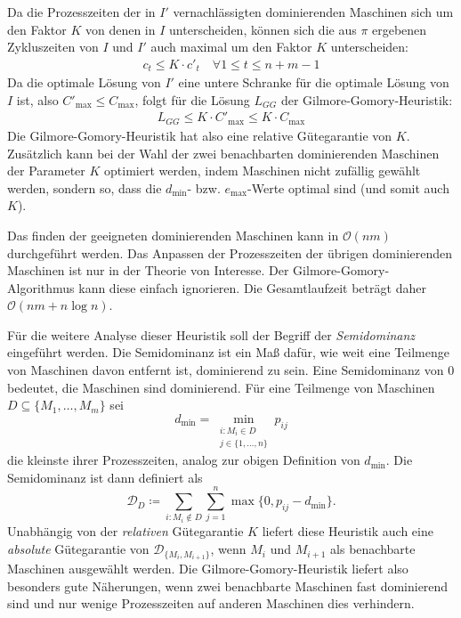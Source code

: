 \documentclass{scrreprt}
\begin{document}
Da die Prozesszeiten der in $I'$ vernachlässigten dominierenden Maschinen sich um den Faktor $K$ von denen in $I$ unterscheiden, 
können sich die aus $\pi$ ergebenen Zykluszeiten von $I$ und $I'$ auch maximal um den Faktor $K$ unterscheiden:
\begin{align}
    c_t \leq K\cdot c'_t \quad \forall 1\leq t\leq n+m-1
\end{align}
Da die optimale Lösung von $I'$ eine untere Schranke für die optimale Lösung von $I$ ist, also $C'_{\max} \leq C_{\max}$, folgt für die Lösung $L_{GG}$ der
Gilmore-Gomory-Heuristik:
\begin{align}
    L_{GG} \leq K\cdot C'_{\max} \leq K\cdot C_{\max}
\end{align}
Die Gilmore-Gomory-Heuristik hat also eine relative Gütegarantie von $K$.
Zusätzlich kann bei der Wahl der zwei benachbarten dominierenden Maschinen der Parameter $K$ optimiert werden, indem Maschinen nicht zufällig gewählt werden,
sondern so, dass die $d_{\min}$- bzw. $e_{\max}$-Werte optimal sind (und somit auch $K$).

Das finden der geeigneten dominierenden Maschinen kann in $\mathcal{O}(nm)$ durchgeführt werden. 
Das Anpassen der Prozesszeiten der übrigen dominierenden Maschinen ist nur in der Theorie von Interesse.
Der Gilmore-Gomory-Algorithmus kann diese einfach ignorieren.
Die Gesamtlaufzeit beträgt daher $\mathcal{O}(nm + n\log n)$.

Für die weitere Analyse dieser Heuristik soll der Begriff der \textit{Semidominanz} eingeführt werden.
Die Semidominanz ist ein Maß dafür, wie weit eine Teilmenge von Maschinen davon entfernt ist, dominierend zu sein.
Eine Semidominanz von $0$ bedeutet, die Maschinen sind dominierend.
Für eine Teilmenge von Maschinen $D\subseteq\{M_1,\ldots,M_m\}$ sei 
\[d_{\min} = \min_{\substack{i:M_i\in D \\ j\in\{1,\ldots,n\}}} p_{ij}\] 
die kleinste ihrer Prozesszeiten, analog zur obigen Definition von $d_{\min}$.
Die Semidominanz ist dann definiert als
\[\mathcal{D}_{D} \coloneqq \sum_{i: M_i\not\in D} \sum_{j=1}^n \max\{0,p_{ij}-d_{\min}\} \text{.}\]
Unabhängig von der \textit{relativen} Gütegarantie $K$ liefert diese Heuristik auch eine \textit{absolute} Gütegarantie von $\mathcal{D}_{\{M_i,M_{i+1}\}}$, 
wenn $M_i$ und $M_{i+1}$ als benachbarte Maschinen ausgewählt werden.
Die Gilmore-Gomory-Heuristik liefert also besonders gute Näherungen, wenn zwei benachbarte Maschinen fast dominierend sind und nur wenige Prozesszeiten auf anderen
Maschinen dies verhindern.
\end{document}
